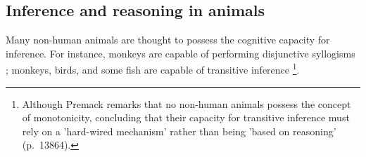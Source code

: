 \subsection{Inference and reasoning in animals}

Many non-human animals are thought to possess the cognitive capacity for inference. For instance, monkeys are capable of performing disjunctive syllogisms \citep{Ferrigno21}; monkeys, birds, and some fish are capable of transitive inference \citep{Premack07}\footnote{Although Premack remarks that no non-human animals possess the concept of monotonicity, concluding that their capacity for transitive inference must rely on a 'hard-wired mechanism' rather than being 'based on reasoning' (p.~13864).}.

